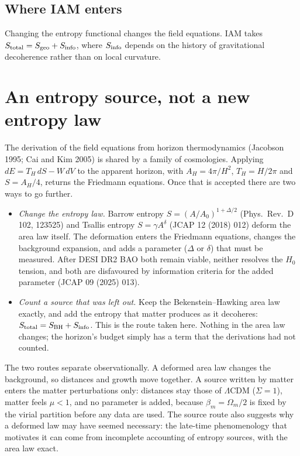 \subsection{Where IAM enters}
Changing the entropy functional changes the field equations. IAM takes $S_{\rm total}=S_{\rm geo}+S_{\rm info}$, where $S_{\rm info}$ depends on the
history of gravitational decoherence rather than on local curvature.

\section{An entropy source, not a new entropy law}\label{sec:source}
The derivation of the field equations from horizon thermodynamics (Jacobson 1995; Cai and Kim 2005) is shared by a family of cosmologies. Applying
$dE=T_H\,dS-W\,dV$ to the apparent horizon, with $A_H=4\pi/H^2$, $T_H=H/2\pi$ and $S=A_H/4$, returns the Friedmann equations. Once that is accepted
there are two ways to go further.
\begin{itemize}
\item \emph{Change the entropy law.} Barrow entropy $S=(A/A_0)^{1+\Delta/2}$ (Phys.\ Rev.\ D 102, 123525) and Tsallis entropy $S=\gamma A^\delta$
(JCAP 12 (2018) 012) deform the area law itself. The deformation enters the Friedmann equations, changes the background expansion, and adds a parameter
($\Delta$ or $\delta$) that must be measured. After DESI DR2 BAO both remain viable, neither resolves the $H_0$ tension, and both are disfavoured by
information criteria for the added parameter (JCAP 09 (2025) 013).
\item \emph{Count a source that was left out.} Keep the Bekenstein--Hawking area law exactly, and add the entropy that matter produces as it
decoheres: $S_{\rm total}=S_{\rm BH}+S_{\rm info}$. This is the route taken here. Nothing in the area law changes; the horizon's budget simply has a term
that the derivations had not counted.
\end{itemize}
The two routes separate observationally. A deformed area law changes the background, so distances and growth move together. A source written by
matter enters the matter perturbations only: distances stay those of $\Lambda$CDM ($\Sigma=1$), matter feels $\mu<1$, and no parameter is added,
because $\beta_m=\Omega_m/2$ is fixed by the virial partition before any data are used. The source route also suggests why a deformed law may have
seemed necessary: the late-time phenomenology that motivates it can come from incomplete accounting of entropy sources, with the area law exact.


